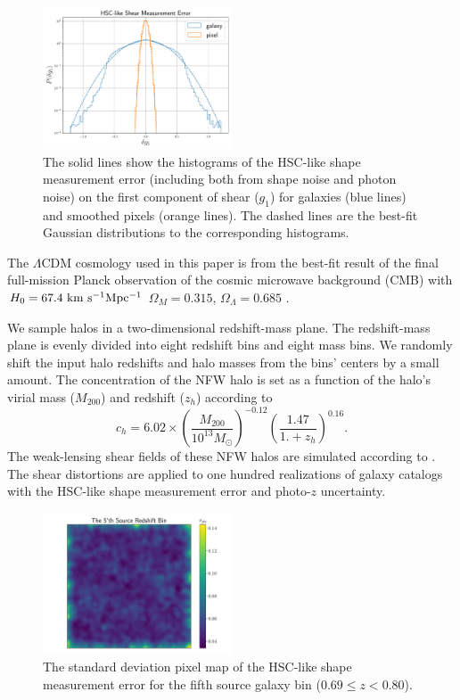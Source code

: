 \begin{figure}
 \centering
 \includegraphics[width=0.5\textwidth]{shapeMeasurementError-HSCY1.pdf}
 \caption{The solid lines show the histograms of the HSC-like shape measurement
     error (including both from shape noise and photon noise) on the first
     component of shear ($g_1$) for galaxies (blue lines) and smoothed pixels
     (orange lines). The dashed lines are the best-fit Gaussian distributions
     to the corresponding histograms.
    }
 \label{fig_noiseHistogram}
\end{figure}

The $\Lambda$CDM cosmology used in this paper is from the best-fit result of
the final full-mission Planck observation of the cosmic microwave background
(CMB) with $H_0=67.4 ~\rm{km~s^{-1} Mpc^{-1}}$ $\Omega_M=0.315$,
$\Omega_\Lambda=0.685$ \citep{cmb-Planck2018-Cosmology}.

We sample halos in a two-dimensional redshift-mass plane. The redshift-mass
plane is evenly divided into eight redshift bins and eight mass bins. We
randomly shift the input halo redshifts and halo masses from the bins' centers
by a small amount. The concentration of the NFW halo is set as a function of
the halo's virial mass ($M_{200}$) and redshift ($z_{h}$) according to
\citet{c-M_Magneticum-Ragagnin2019}
\begin{equation}
c_{h}=6.02\times\left(\frac{M_{200}}{10^{13} M_{\odot}}\right)^{-0.12}
\left(\frac{1.47}{1.+z_h}\right)^{0.16}.
\end{equation}
The weak-lensing shear fields of these NFW halos are simulated according to
\citet{haloModel-TJ2003-3pt}. The shear distortions are applied to one hundred
realizations of galaxy catalogs with the HSC-like shape measurement error and
photo-$z$ uncertainty.

\begin{figure}
 \centering
 \includegraphics[width=0.5\textwidth]{noise_std_map_pix.pdf}
 \caption{The standard deviation pixel map of the HSC-like shape measurement
     error for the fifth source galaxy bin ($0.69 \leq z < 0.80 $).
        } \label{fig_noistdmap}
\end{figure}

